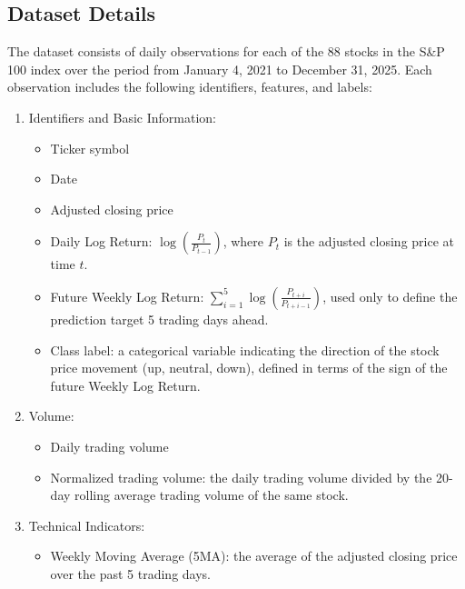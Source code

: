 \documentclass{article}
\begin{document}



\begin{appendix}

    \section{Dataset Details}
    \label{appendix:dataset_details}

    The dataset consists of daily observations for each of the 88 stocks in the S\&P 100 index over the period from January 4, 2021 to December 31, 2025. Each observation includes the following identifiers, features, and labels:
    \begin{enumerate}
        \item Identifiers and Basic Information:
              \begin{itemize}
                  \item Ticker symbol
                  \item Date
                  \item Adjusted closing price
                  \item Daily Log Return: $\log\left(\frac{P_t}{P_{t-1}}\right)$, where $P_t$ is the adjusted closing price at time $t$.
                  \item Future Weekly Log Return: $\sum_{i=1}^{5}\log\left(\frac{P_{t+i}}{P_{t+i-1}}\right)$, used only to define the prediction target 5 trading days ahead.
                  \item Class label: a categorical variable indicating the direction of the stock price movement (up, neutral, down), defined in terms of the sign of the future Weekly Log Return.
              \end{itemize}
        \item Volume:
              \begin{itemize}
                  \item Daily trading volume
                  \item Normalized trading volume: the daily trading volume divided by the 20-day rolling average trading volume of the same stock.
              \end{itemize}
        \item Technical Indicators:
              \begin{itemize}
                  \item Weekly Moving Average (5MA): the average of the adjusted closing price over the past 5 trading days.

\end{itemize}
\end{enumerate}
\end{appendix}
\end{document}
